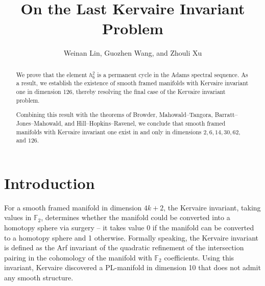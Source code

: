 \documentclass{amsart}
\title{On the Last Kervaire Invariant Problem}
\author{Weinan Lin, Guozhen Wang, and Zhouli Xu}
\date{}
\numberwithin{equation}{section}
\begin{document}
\begin{abstract}
We prove that the element $h_6^2$ is a permanent cycle in the Adams spectral sequence. As a result, we establish the existence of smooth framed manifolds with Kervaire invariant one in dimension 126, thereby resolving the final case of the Kervaire invariant problem.

Combining this result with the theorems of Browder, Mahowald--Tangora, Barratt--Jones--Mahowald, and Hill--Hopkins--Ravenel, we conclude that smooth framed manifolds with Kervaire invariant one exist in and only in dimensions  $2, 6, 14, 30, 62$, and $126$.
\end{abstract}

\maketitle

\section{Introduction}








For a smooth framed manifold in dimension $4k+2$, the Kervaire invariant, taking values in $\mathbb{F}_2$, determines whether the manifold could be converted into a homotopy sphere via surgery -- it takes value 0 if the manifold can be converted to a homotopy sphere and 1 otherwise. Formally speaking, the Kervaire invariant is defined as the Arf invariant of the quadratic refinement of the intersection pairing in the cohomology of the manifold with $\mathbb{F}_2$ coefficients. Using this invariant, Kervaire \cite{Kervaire} discovered a PL-manifold in dimension 10 that does not admit any smooth structure. 
\end{document}
